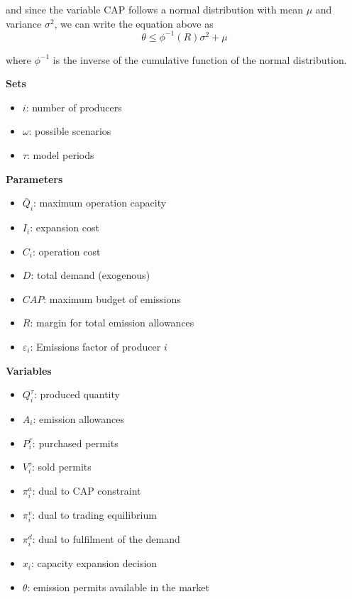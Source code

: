 \documentclass[11pt, letterpaper]{article}
\begin{document}
and since the variable CAP follows a normal distribution with mean $\mu$ and variance $\sigma^2$, we can write the equation above as
\begin{equation}
    \theta \leq \phi^{-1}(R) \sigma^2 + \mu
\end{equation}

where $\phi^{-1}$ is the inverse of the cumulative function of the normal distribution. 


\hspace{0.5cm}

\begin{flushleft}
\textbf{Sets}
\begin{itemize}
    \item[] $i$: number of producers
    \item[] $\omega$: possible scenarios
    \item[] $\tau$: model periods
    
\end{itemize}

\hspace{0.5cm}

\textbf{Parameters}
\begin{itemize}
   \item[] $\bar{Q}_i$: maximum operation capacity
   \item[] $I_i$: expansion cost
   \item[] $C_i$: operation cost
   \item[] $D$: total demand (exogenous)
   \item[] $CAP$: maximum budget of emissions 
   \item[] $R$: margin for total emission allowances
 \item[] $\varepsilon_{i}$: Emissions factor of producer $i$
\end{itemize}
\hspace{0.5cm}

\textbf{Variables}
\begin{itemize}
    \item[] $Q^{\tau}_i$: produced quantity
    \item[] $A_i$: emission allowances
    \item[] $P^{\tau}_i$: purchased permits
    \item[] $V^{\tau}_i$: sold permits
    \item[] $\pi^{a}_i$: dual to CAP constraint
    \item[] $\pi^{v}_i$: dual to trading equilibrium
    \item[] $\pi^{d}_i$: dual to fulfilment of the demand
    \item[] $x_i$: capacity expansion decision
    \item[] $\theta$: emission permits available in the market
    \end{itemize}


\end{flushleft}
\end{document}
